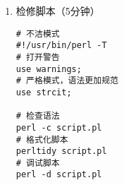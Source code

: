 \documentclass{TIJMUjiaoanLL}
\begin{document}
\begin{enumerate}
\begin{enumerate}
      \item while
    \vspace*{-10pt}
    \begin{figure}[h]
      \texttt{[image: c9\_perl\_while\_01.png]}
      \texttt{[image: c9\_perl\_do\_while\_01.jpg]}
    \end{figure}
    \vspace*{-28pt}
    \begin{multicols}{2}
\begin{verbatim}
$i = 0;
# while
while ($i < 10) {
  print "$i\n";
  $i++;
}

# do-while
do {
  print "$i\n";
  $i = $i + 1;
} while ($i < 10);
\end{verbatim}
\end{multicols}
    \vspace*{-12pt}

      \item until
    \vspace*{-15pt}
    \begin{multicols}{2}
\begin{verbatim}
$i = 0;
# until
until ($i == 10) {
  print "$i\n";
  $i++;
}

# do-until
do {
  print "$i\n";
  $i++;
} until ($i == 10);
\end{verbatim}
\end{multicols}
    \vspace*{-25pt}
    \end{enumerate}

\otherTail
\newpage
\otherHeader

    \vspace*{-10pt}
    \begin{figure}[h]
      \centering
      \texttt{[image: c9\_perl\_until\_01.png]}
      \qquad \qquad
      \texttt{[image: c9\_perl\_do\_until\_01.png]}
    \end{figure}
    \vspace*{-10pt}

  \item 检修脚本（5分钟）
    \vspace*{-10pt}
    \begin{multicols}{2}
\begin{verbatim}
# 不洁模式
#!/usr/bin/perl -T
# 打开警告
use warnings;
# 严格模式，语法更加规范
use strcit;

# 检查语法
perl -c script.pl
# 格式化脚本
perltidy script.pl
# 调试脚本
perl -d script.pl
\end{verbatim}
    \end{multicols}
    \vspace*{-20pt}


\end{enumerate}
\end{document}
